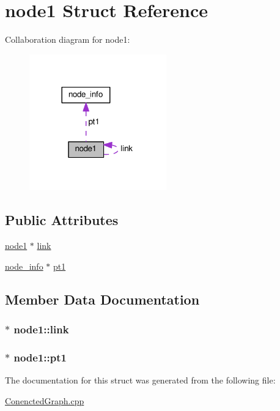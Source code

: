 \hypertarget{structnode1}{}\section{node1 Struct Reference}
\label{structnode1}


Collaboration diagram for node1\+:
\nopagebreak
\begin{figure}[H]
\begin{center}
\leavevmode
\includegraphics[width=168pt]{structnode1__coll__graph}
\end{center}
\end{figure}
\subsection*{Public Attributes}
\begin{DoxyCompactItemize}
\item 
\hyperlink{structnode1}{node1} $\ast$ \hyperlink{structnode1_a7c5f011dde8e80cc5a24a5fad943138d}{link}
\item 
\hyperlink{structnode__info}{node\+\_\+info} $\ast$ \hyperlink{structnode1_a6c3bc0362d5ce74f576c735c17747b28}{pt1}
\end{DoxyCompactItemize}


\subsection{Member Data Documentation}
\subsubsection[{\texorpdfstring{link}{link}}]{$\ast$ node1\+::link}\hypertarget{structnode1_a7c5f011dde8e80cc5a24a5fad943138d}{}\label{structnode1_a7c5f011dde8e80cc5a24a5fad943138d}
\subsubsection[{\texorpdfstring{pt1}{pt1}}]{$\ast$ node1\+::pt1}\hypertarget{structnode1_a6c3bc0362d5ce74f576c735c17747b28}{}\label{structnode1_a6c3bc0362d5ce74f576c735c17747b28}


The documentation for this struct was generated from the following file\+:\begin{DoxyCompactItemize}
\item 
\hyperlink{ConenctedGraph_8cpp}{Conencted\+Graph.\+cpp}\end{DoxyCompactItemize}
